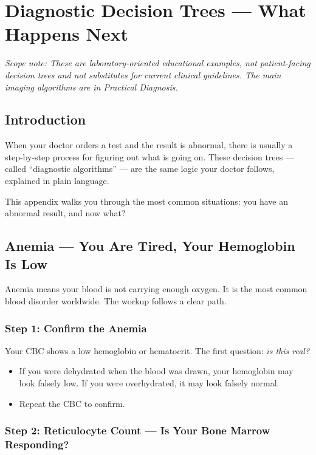 \chapter{Diagnostic Decision Trees --- What Happens Next}
\label{app:algorithms}

\textit{Scope note: These are laboratory-oriented educational examples, not patient-facing decision trees and not substitutes for current clinical guidelines. The main imaging algorithms are in Practical Diagnosis.}

\clearpage
\section{Introduction}

When your doctor orders a test and the result is abnormal, there is usually a step-by-step process for figuring out what is going on. These decision trees --- called ``diagnostic algorithms'' --- are the same logic your doctor follows, explained in plain language.

This appendix walks you through the most common situations: you have an abnormal result, and now what?

\clearpage
\section{Anemia --- You Are Tired, Your Hemoglobin Is Low}

Anemia means your blood is not carrying enough oxygen. It is the most common blood disorder worldwide. The workup follows a clear path.

\subsection{Step 1: Confirm the Anemia}

Your CBC shows a low hemoglobin or hematocrit. The first question: \emph{is this real?}

\begin{itemize}
    \item If you were dehydrated when the blood was drawn, your hemoglobin may look falsely low. If you were overhydrated, it may look falsely normal.
    \item Repeat the CBC to confirm.
\end{itemize}

\subsection{Step 2: Reticulocyte Count --- Is Your Bone Marrow Responding?}

